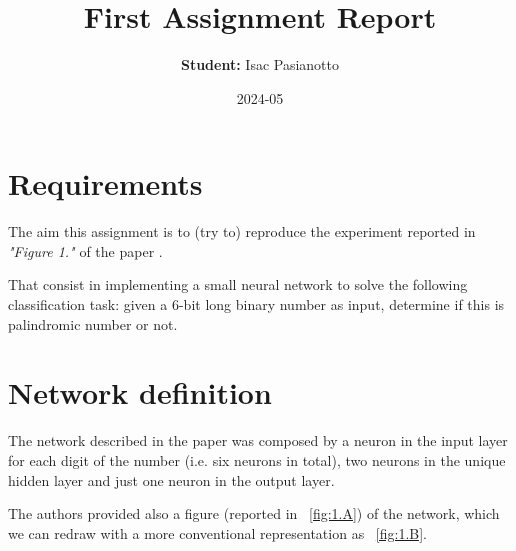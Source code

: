\documentclass{article}
\title{First Assignment Report}
\author{\textbf{Student:} Isac Pasianotto}
\date{2024-05}
\begin{document}
    \maketitle

    \section{Requirements}\label{sec:requirements}

    The aim this assignment is to (try to) reproduce the experiment reported in \textit{"Figure 1."}
    of the paper \cite{Rumelhart1986LearningRB}.

    That consist in implementing a small neural network to solve the following classification task:
    given a 6-bit long binary number as input, determine if this is palindromic number or not.

    \section{Network definition}\label{sec:network-definition}

    The network described in the paper was composed by a neuron in the input layer for each digit of
    the number (i.e. six neurons in total), two neurons in the unique hidden layer and just one neuron
    in the output layer.

    \noindent The authors provided also a figure (reported in ~\ref{fig:1.A}) of the network, which we can
    redraw with a more conventional representation as ~\ref{fig:1.B}.
\end{document}
